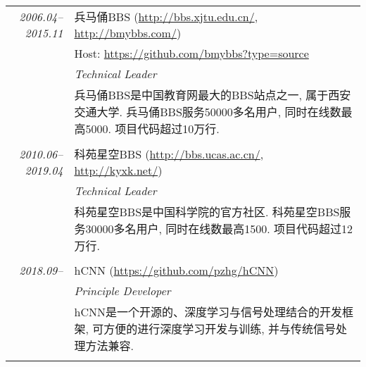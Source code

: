 \documentclass[paper=a4,fontsize=11pt]{scrartcl}
\begin{document}
\begin{longtable}{r|p{11cm}}
	\emph{2006.04--2015.11} & 兵马俑BBS (\href{http://bbs.xjtu.edu.cn/}{http://bbs.xjtu.edu.cn/}, \href{http://bmybbs.com/}{http://bmybbs.com/}) \\
	& Host: \href{https://github.com/bmybbs?type=source}{https://github.com/bmybbs?type=source} \\
	& \emph{Technical Leader} \\ 
	& \footnotesize{兵马俑BBS是中国教育网最大的BBS站点之一, 属于西安交通大学. 兵马俑BBS服务50000多名用户, 同时在线数最高5000. 项目代码超过10万行.}\\
	\multicolumn{2}{c}{} \\
	
	\emph{2010.06--2019.04} & 科苑星空BBS (\href{http://bbs.ucas.ac.cn/}{http://bbs.ucas.ac.cn/}, \href{http://kyxk.net/}{http://kyxk.net/}) \\
	& \emph{Technical Leader} \\ 
	& \footnotesize{科苑星空BBS是中国科学院的官方社区. 科苑星空BBS服务30000多名用户, 同时在线数最高1500. 项目代码超过12万行.}\\
	\multicolumn{2}{c}{} \\
	
	\emph{2018.09--} & hCNN (\href{https://github.com/pzhg/hCNN}{https://github.com/pzhg/hCNN}) \\
	& \emph{Principle Developer} \\ 
	& \footnotesize{hCNN是一个开源的、深度学习与信号处理结合的开发框架, 可方便的进行深度学习开发与训练, 并与传统信号处理方法兼容.}\\
	\multicolumn{2}{c}{} 
	
\end{longtable}



%
%
%
\end{document}
